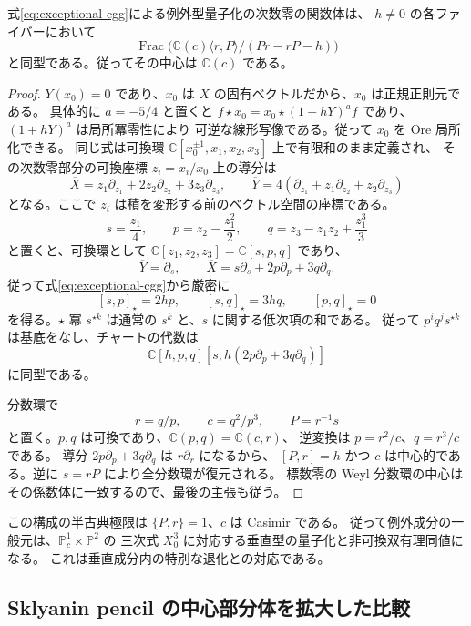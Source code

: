 \begin{proposition}\label{prop:exceptional-weyl}
式\eqref{eq:exceptional-cgg}による例外型量子化の次数零の関数体は、
$h\ne0$ の各ファイバーにおいて
\[
 \operatorname{Frac}\bigl(\mathbb C(c)\langle r,P\rangle/(Pr-rP-h)\bigr)
\]
と同型である。従ってその中心は $\mathbb C(c)$ である。
\end{proposition}
\begin{proof}
$Y(x_0)=0$ であり、$x_0$ は $X$ の固有ベクトルだから、$x_0$ は正規正則元である。
具体的に $a=-5/4$ と置くと
$f\star x_0=x_0\star(1+hY)^a f$ であり、$(1+hY)^a$ は局所冪零性により
可逆な線形写像である。従って $x_0$ を Ore 局所化できる。
同じ式は可換環 $\mathbb C[x_0^{\pm1},x_1,x_2,x_3]$ 上で有限和のまま定義され、
その次数零部分の可換座標 $z_i=x_i/x_0$ 上の導分は
\[
 \overline X=z_1\partial_{z_1}+2z_2\partial_{z_2}+3z_3\partial_{z_3},
 \qquad
 \overline Y=4(\partial_{z_1}+z_1\partial_{z_2}+z_2\partial_{z_3})
\]
となる。ここで $z_i$ は積を変形する前のベクトル空間の座標である。
\[
 s=\frac{z_1}{4},\qquad
 p=z_2-\frac{z_1^2}{2},\qquad
 q=z_3-z_1z_2+\frac{z_1^3}{3}
\]
と置くと、可換環として $\mathbb C[z_1,z_2,z_3]=\mathbb C[s,p,q]$ であり、
\[
 \overline Y=\partial_s,\qquad
 \overline X=s\partial_s+2p\partial_p+3q\partial_q.
\]
従って式\eqref{eq:exceptional-cgg}から厳密に
\[
 [s,p]_\star=2hp,\qquad [s,q]_\star=3hq,\qquad [p,q]_\star=0
\]
を得る。$\star$ 冪 $s^{\star k}$ は通常の $s^k$ と、$s$ に関する低次項の和である。
従って $p^iq^js^{\star k}$ は基底をなし、チャートの代数は
\[
 \mathbb C[h,p,q][s;h(2p\partial_p+3q\partial_q)]
\]
に同型である。

分数環で
\[
 r=q/p,\qquad c=q^2/p^3,\qquad P=r^{-1}s
\]
と置く。$p,q$ は可換であり、$\mathbb C(p,q)=\mathbb C(c,r)$、
逆変換は $p=r^2/c$、$q=r^3/c$ である。
導分 $2p\partial_p+3q\partial_q$ は $r\partial_r$ になるから、
$[P,r]=h$ かつ $c$ は中心的である。逆に $s=rP$ により全分数環が復元される。
標数零の Weyl 分数環の中心はその係数体に一致するので、最後の主張も従う。
\end{proof}

この構成の半古典極限は $\{P,r\}=1$、$c$ は Casimir である。
従って例外成分の一般元は、$\mathbb P^1_c\times\mathbb P^2$ の
三次式 $X_0^3$ に対応する垂直型の量子化と非可換双有理同値になる。
これは垂直成分内の特別な退化との対応である。

\subsection{Sklyanin pencil の中心部分体を拡大した比較}
\label{subsec:sklyanin-central-extension}

